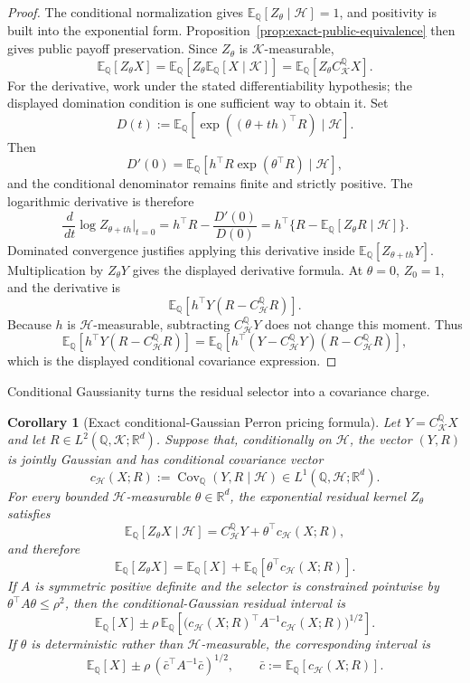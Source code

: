 \documentclass[11pt,a4paper]{amsart}
\theoremstyle{plain}
\newtheorem{corollary}[theorem]{Corollary}
\theoremstyle{definition}
\theoremstyle{remark}
\DeclareMathOperator{\Cov}{Cov}
\newcommand{\R}{\mathbb{R}}
\newcommand{\QQ}{\mathbb{Q}}
\newcommand{\EE}{\mathbb{E}}
\newcommand{\cH}{\mathcal{H}}
\newcommand{\cK}{\mathcal{K}}
\newcommand{\dd}{\,d}
\begin{document}
\begin{proof}
The conditional normalization gives \(\EE_\QQ[Z_\theta\mid\cH]=1\), and positivity is built
into the exponential form.  Proposition~\ref{prop:exact-public-equivalence} then gives public
payoff preservation.  Since \(Z_\theta\) is \(\cK\)-measurable,
\[
        \EE_\QQ[Z_\theta X]
        =
        \EE_\QQ[Z_\theta\EE_\QQ[X\mid\cK]]
        =
        \EE_\QQ[Z_\theta C_{\cK}^{\QQ}X].
\]
For the derivative, work under the stated differentiability hypothesis; the displayed domination
condition is one sufficient way to obtain it.  Set
\[
        D(t):=\EE_\QQ[\exp((\theta+t h)^\top R)\mid\cH].
\]
Then
\[
        D'(0)=\EE_\QQ[h^\top R\exp(\theta^\top R)\mid\cH],
\]
and the conditional denominator remains finite and strictly positive.  The logarithmic derivative
is therefore
\[
        \frac{\dd}{\dd t}\log Z_{\theta+t h}\bigg|_{t=0}
        =
        h^\top R-\frac{D'(0)}{D(0)}
        =
        h^\top\{R-\EE_\QQ[Z_\theta R\mid\cH]\}.
\]
Dominated convergence justifies applying this derivative inside
\(\EE_\QQ[Z_{\theta+t h}Y]\).  Multiplication by \(Z_\theta Y\) gives the displayed derivative
formula.  At \(\theta=0\), \(Z_0=1\), and the derivative is
\[
        \EE_\QQ[h^\top Y(R-C_{\cH}^{\QQ}R)].
\]
Because \(h\) is \(\cH\)-measurable, subtracting \(C_{\cH}^{\QQ}Y\) does not change this moment.
Thus
\[
        \EE_\QQ[h^\top Y(R-C_{\cH}^{\QQ}R)]
        =
        \EE_\QQ[h^\top(Y-C_{\cH}^{\QQ}Y)(R-C_{\cH}^{\QQ}R)],
\]
which is the displayed conditional covariance expression.
\end{proof}

Conditional Gaussianity turns the residual selector into a covariance charge.

\begin{corollary}[Exact conditional-Gaussian Perron pricing formula]\label{cor:conditional-gaussian-pricing}
Let \(Y=C_{\cK}^{\QQ}X\) and let \(R\in L^2(\QQ,\cK;\R^d)\).  Suppose that, conditionally on
\(\cH\), the vector \((Y,R)\) is jointly Gaussian and has conditional covariance vector
\[
        c_{\cH}(X;R)
        :=
        \Cov_\QQ(Y,R\mid\cH)
        \in L^1(\QQ,\cH;\R^d).
\]
For every bounded \(\cH\)-measurable \(\theta\in\R^d\), the exponential residual kernel
\(Z_\theta\) satisfies
\[
        \EE_\QQ[Z_\theta X\mid\cH]
        =
        C_{\cH}^{\QQ}Y
        +
        \theta^\top c_{\cH}(X;R),
\]
and therefore
\[
        \EE_\QQ[Z_\theta X]
        =
        \EE_\QQ[X]
        +
        \EE_\QQ[\theta^\top c_{\cH}(X;R)].
\]
If \(A\) is symmetric positive definite and the selector is constrained pointwise by
\(\theta^\top A\theta\le\rho^2\), then the conditional-Gaussian residual interval is
\[
        \EE_\QQ[X]
        \pm
        \rho\,\EE_\QQ\!\left[
        \bigl(c_{\cH}(X;R)^\top A^{-1}c_{\cH}(X;R)\bigr)^{1/2}
        \right].
\]
If \(\theta\) is deterministic rather than \(\cH\)-measurable, the corresponding interval is
\[
        \EE_\QQ[X]
        \pm
        \rho\,(\bar c^\top A^{-1}\bar c)^{1/2},
        \qquad
        \bar c:=\EE_\QQ[c_{\cH}(X;R)].
\]
\end{corollary}
\end{document}

